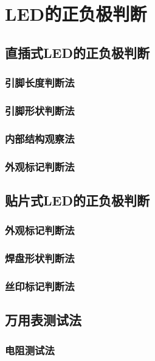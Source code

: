 \documentclass[12pt,UTF8]{ctexbook}
\begin{document}
\section{LED的正负极判断}

\subsection{直插式LED的正负极判断}

\subsubsection{引脚长度判断法}

\subsubsection{引脚形状判断法}

\subsubsection{内部结构观察法}

\subsubsection{外观标记判断法}

\subsection{贴片式LED的正负极判断}

\subsubsection{外观标记判断法}

\subsubsection{焊盘形状判断法}

\subsubsection{丝印标记判断法}

\subsection{万用表测试法}

\subsubsection{电阻测试法}
\end{document}
